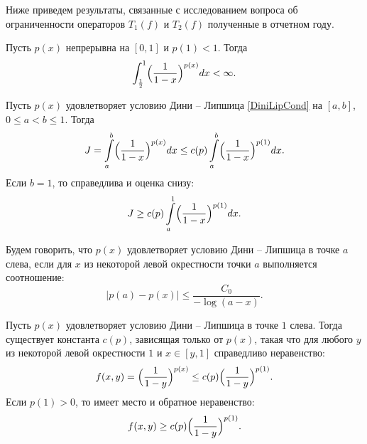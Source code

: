 Ниже приведем результаты, связанные с исследованием вопроса об ограниченности операторов $T_1(f)$ и $T_2(f)$ полученные в отчетном году.
\begin{lemma}\label{st-Int1-x-p4-bounded}
Пусть $p(x)$ непрерывна на $[0,1]$ и $p(1)<1$. Тогда
\begin{equation}\label{int-of-1-x-qrtr-exp}
  \int_{\frac12}^1\Bigl(\frac1{1-x}\Bigr)^{p(x)}dx<\infty.
\end{equation}
\end{lemma}

\begin{lemma}\label{est-px-p1}
Пусть $p(x)$ удовлетворяет условию Дини -- Липшица \eqref{DiniLipCond} на $[a,b]$, $0 \le a < b \le 1$. Тогда
\begin{equation}
J=\int\limits_{a}^{b} \Bigl( \frac{1}{1-x} \Bigr)^{p(x)}dx \le
c(p) \int\limits_{a}^{b} \Bigl( \frac{1}{1-x} \Bigr)^{p(1)}dx.
\end{equation}
Если $b=1$, то справедлива и оценка снизу:
\begin{equation}
J \ge
c(p) \int\limits_{a}^{1} \Bigl( \frac{1}{1-x} \Bigr)^{p(1)}dx.
\end{equation}
\end{lemma}
\begin{definition}
Будем говорить, что $p(x)$ удовлетворяет условию Дини -- Липшица в точке $a$ слева, если для $x$ из некоторой левой окрестности точки $a$ выполняется соотношение:
\begin{equation}\label{DL-at-point}
|p(a)-p(x)| \le \frac{C_0}{-\log(a-x)}.
\end{equation}
\end{definition}

\begin{lemma}\label{st-px-p1-func}
Пусть $p(x)$ удовлетворяет условию Дини -- Липшица в точке $1$ слева. Тогда существует константа $c(p)$, зависящая только от $p(x)$, такая что для любого $y$ из некоторой левой окрестности $1$ и $x \in [y,1]$ справедливо неравенство:
\begin{equation}
f(x,y)=\Bigl(\frac{1}{1-y}\Bigr)^{p(x)} \le c(p)\Bigl(\frac{1}{1-y}\Bigr)^{p(1)}.
\end{equation}
Если $p(1)>0$, то имеет место и обратное неравенство:
\begin{equation}
f(x,y) \ge c(p)\Bigl(\frac{1}{1-y}\Bigr)^{p(1)}.
\end{equation}
\end{lemma}



